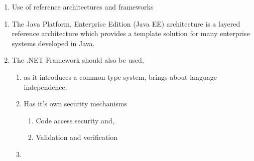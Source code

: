 \documentclass{article} %
\begin{document}


\noindent 

\noindent 

\noindent 

\noindent 

\noindent 

\begin{enumerate}
\item  Use of reference architectures and frameworks 
\end{enumerate}

\noindent 

\begin{enumerate}
\item  The Java Platform, Enterprise Edition (Java EE) architecture is a layered reference architecture which provides a template solution for many enterprise systems developed in Java.

\item  The .NET Framework should also be used, 

\begin{enumerate}
\item  as it introduces a common type system, brings about language independence.

\item  Has it's own security mechanisms

\begin{enumerate}
\item  Code access security and,

\item  Validation and verification
\end{enumerate}

\item  
\end{enumerate}
\end{enumerate}

\noindent 
\end{document}
